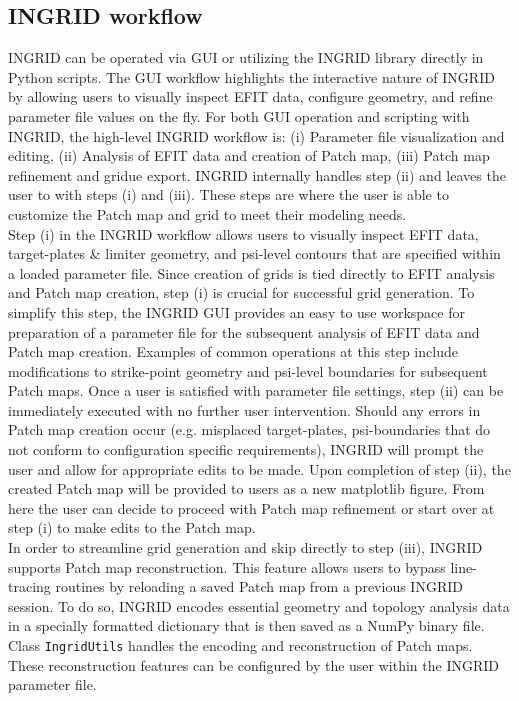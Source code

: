 \subsection{\label{sec:level2}INGRID workflow}
INGRID can be operated via GUI or utilizing the INGRID library directly in Python scripts. The GUI workflow highlights the interactive nature of INGRID by allowing users to visually inspect EFIT data, configure geometry, and refine parameter file values on the fly. For both GUI operation and scripting with INGRID, the high-level INGRID workflow is: (i)  Parameter file visualization and editing, (ii) Analysis of EFIT data and creation of Patch map, (iii) Patch map refinement and gridue export.
\noindent
INGRID internally handles step (ii) and leaves the user to with steps (i) and (iii). These steps are where the user is able to customize the Patch map and grid to meet their modeling needs.\\ \indent
Step (i) in the INGRID workflow allows users to visually inspect EFIT data, target-plates \& limiter geometry, and psi-level contours that are specified within a loaded parameter file. Since creation of grids is tied directly to EFIT analysis and Patch map creation, step (i) is crucial for successful grid generation. To simplify this step, the INGRID GUI provides an easy to use workspace for preparation of a parameter file for the subsequent analysis of EFIT data and Patch map creation. Examples of common operations at this step include modifications to strike-point geometry and psi-level boundaries for subsequent Patch maps. Once a user is satisfied with parameter file settings, step (ii) can be immediately executed with no further user intervention. Should any errors in Patch map creation occur (e.g. misplaced target-plates, psi-boundaries that do not conform to configuration specific requirements), INGRID will prompt the user and allow for appropriate edits to be made. Upon completion of step (ii), the created Patch map will be provided to users as a new matplotlib figure. From here the user can decide to proceed with Patch map refinement or start over at step (i) to make edits to the Patch map.\\ \indent
In order to streamline grid generation and skip directly to step (iii), INGRID supports Patch map reconstruction. This feature allows users to bypass line-tracing routines by reloading a saved Patch map from a previous INGRID session. To do so, INGRID encodes essential geometry and topology analysis data in a specially formatted dictionary that is then saved as a NumPy binary file. Class \texttt{IngridUtils} handles the encoding and reconstruction of Patch maps. These reconstruction features can be configured by the user within the INGRID parameter file.\\ \indent
